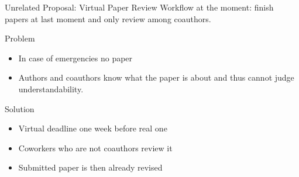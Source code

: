 \documentclass[14pt]{beamer}
\begin{document}
\begin{frame}{Unrelated Proposal: Virtual Paper Review}
Workflow at the moment: finish papers at last moment and only review among coauthors.
{
\begin{block}{Problem}
\begin{itemize}
\item In case of emergencies no paper 
\item Authors and coauthors know what the paper is about and thus cannot judge understandability.
\end{itemize}
\end{block}
}
{
\begin{block}{Solution}
\begin{itemize}
\item Virtual deadline one week before real one
\item Coworkers who are not coauthors review it
\item Submitted paper is then already revised 
\end{itemize}
\end{block}
}
\end{frame}
\end{document}
